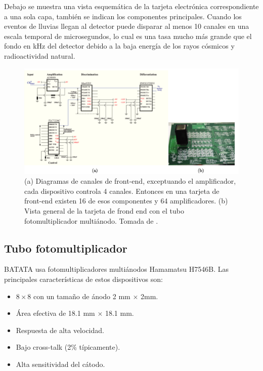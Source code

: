 \documentclass[a4paper,10pt]{article}
\numberwithin{equation}{section}
\begin{document}
Debajo se muestra una vista esquemática de la tarjeta electrónica correspondiente 
a una sola capa, también se indican los componentes principales. Cuando los eventos 
de lluvias llegan al detector puede disparar al menos 10 canales en una escala 
temporal de microsegundos, lo cual es una tasa mucho más grande que el fondo en 
kHz del detector debido a la baja energía de los rayos cósmicos y radioactividad 
natural. 

\begin{figure}[H]
 \center 
 \includegraphics[scale=0.6]{fig5}
 \caption{(a) Diagramas de canales de front-end, exceptuando el amplificador, cada 
 dispositivo controla 4 canales. Entonces en una tarjeta de front-end existen 16 de esos 
 componentes y 64 amplificadores. (b) Vista general de la tarjeta de frond end 
 con el tubo fotomultiplicador multiánodo. Tomada de \cite{trovato}.}
\end{figure}

\subsection{Tubo fotomultiplicador}

BATATA usa fotomultiplicadores multiánodos Hamamatsu H7546B. Las principales características 
de estos dispositivos son:

\begin{itemize}
 \item $8 \times 8$ con un tamaño de ánodo 2 mm $\times$ 2mm.
 \item Área efectiva de 18.1 mm $\times$ 18.1 mm.
 \item Respuesta de alta velocidad.
 \item Bajo cross-talk (2\% típicamente).
 \item Alta sensitividad del cátodo.
\end{itemize}
\end{document}
